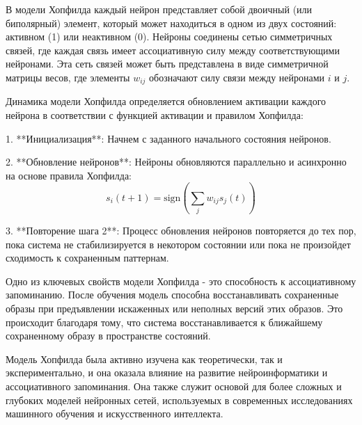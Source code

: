 В модели Хопфилда каждый нейрон представляет собой двоичный (или биполярный) элемент, который может находиться в одном из двух состояний: активном (1) или неактивном (0). Нейроны соединены сетью симметричных связей, где каждая связь имеет ассоциативную силу между соответствующими нейронами. Эта сеть связей может быть представлена в виде симметричной матрицы весов, где элементы \(w_{ij}\) обозначают силу связи между нейронами \(i\) и \(j\).

Динамика модели Хопфилда определяется обновлением активации каждого нейрона в соответствии с функцией активации и правилом Хопфилда:

1. **Инициализация**: Начнем с заданного начального состояния нейронов.

2. **Обновление нейронов**: Нейроны обновляются параллельно и асинхронно на основе правила Хопфилда:
   \[ s_i(t+1) = \text{sign}\left(\sum_j w_{ij} s_j(t)\right) \]

3. **Повторение шага 2**: Процесс обновления нейронов повторяется до тех пор, пока система не стабилизируется в некотором состоянии или пока не произойдет сходимость к сохраненным паттернам.

Одно из ключевых свойств модели Хопфилда - это способность к ассоциативному запоминанию. После обучения модель способна восстанавливать сохраненные образы при предъявлении искаженных или неполных версий этих образов. Это происходит благодаря тому, что система восстанавливается к ближайшему сохраненному образу в пространстве состояний.

Модель Хопфилда была активно изучена как теоретически, так и экспериментально, и она оказала влияние на развитие нейроинформатики и ассоциативного запоминания. Она также служит основой для более сложных и глубоких моделей нейронных сетей, используемых в современных исследованиях машинного обучения и искусственного интеллекта.
